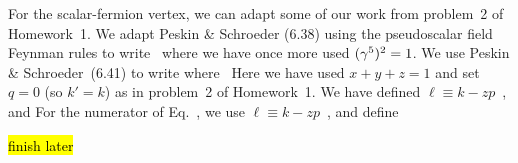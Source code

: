 \documentclass[11pt]{article}
\begin{document}
{	For the scalar-fermion vertex, we can adapt some of our work from problem~2 of Homework~1.  We adapt Peskin \& Schroeder (6.38) using the pseudoscalar field Feynman rules to write~\cite[p.~123]{Peskin}
	where we have once more used $(\gamma^5)^2 = 1$.  We use Peskin \& Schroeder~(6.41) to write 
	where~\cite[pp.~190--191]{Peskin}
	Here we have used $x + y + z = 1$ and set $q = 0$ (so $k' = k$) as in problem~2 of Homework~1.  We have defined $\ell \equiv k - z p$~\cite[p.~191]{Peskin}, and
	For the numerator of Eq.~, we use $\ell \equiv k - z p$~\cite[p.~191]{Peskin}, and define
	
	\hl{finish later}
}


\makebib
\end{document}
